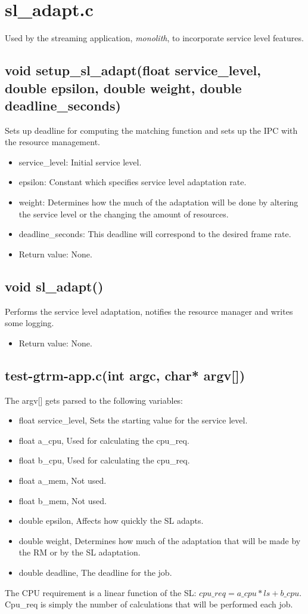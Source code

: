 \documentclass[nobiblatex]{LTHthesis}
\begin{document}
\section{sl\_adapt.c}
Used by the streaming application, \emph{monolith}, to incorporate service level features.
\subsection{void setup\_sl\_adapt(float service\_level, double epsilon, double weight, double deadline\_seconds)}
Sets up deadline for computing the matching function and sets up the IPC with the resource management.
\begin{itemize}
\item service\_level: Initial service level.
\item epsilon: Constant which specifies service level adaptation rate.
\item weight: Determines how the much of the adaptation will be done by altering the service level or the changing the amount of resources.
\item deadline\_seconds: This deadline will correspond to the desired frame rate.
\item Return value: None.
\end{itemize}

\subsection{void sl\_adapt()}
Performs the service level adaptation, notifies the resource manager and writes some logging.
\begin{itemize}
\item Return value: None.
\end{itemize}


\subsection{test-gtrm-app.c(int argc, char* argv[])}
The argv[] gets parsed to the following variables:
\begin{itemize}
		\item float service\_level, Sets the starting value for the service level.
		\item float a\_cpu, Used for calculating the cpu\_req.
		\item float b\_cpu, Used for calculating the cpu\_req.
		\item float a\_mem, Not used.
		\item float b\_mem, Not used.
		\item double epsilon, Affects how quickly the SL adapts.
		\item double weight, Determines how much of the adaptation that will be made by the RM or by the SL adaptation.
		\item double deadline, The deadline for the job.

\end{itemize}
The CPU requirement is a linear function of the SL: $cpu\_req = a\_cpu*ls +b\_cpu  $. Cpu\_req is simply the number of calculations 
that will be performed each job. 
\end{document}
